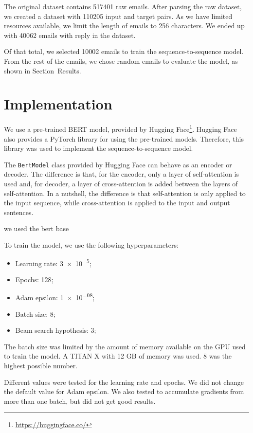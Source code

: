 \documentclass[letterpaper]{article}
\begin{document}
The original dataset contains \num{517401} raw emails. After parsing the raw dataset, we created a dataset with \num{110205} input and target pairs. As we have limited resources available, we limit the length of emails to \num{256} characters. We ended up with \num{40062} emails with reply in the dataset.

Of that total, we selected \num{10002} emails to train the sequence-to-sequence model. From the rest of the emails, we chose random emails to evaluate the model, as shown in Section~Results.


\section{Implementation}

We use a pre-trained BERT model, provided by Hugging Face\footnote{\href{https://huggingface.co/}{https://huggingface.co/}}. Hugging Face also provides a PyTorch library for using the pre-trained models. Therefore, this library was used to implement the sequence-to-sequence model.

The \texttt{BertModel} class provided by Hugging Face can behave as an encoder or decoder. The difference is that, for the encoder, only a layer of self-attention is used and, for decoder, a layer of cross-attention is added between the layers of self-attention. In a nutshell, the difference is that self-attention is only applied to the input sequence, while cross-attention is applied to the input and output sentences.

we used the bert base

To train the model, we use the following hyperparameters:

\begin{itemize}
    \item Learning rate: \num{3e-5};
    \item Epochs: \num{128};
    \item Adam epsilon: \num{1e-08};
    \item Batch size: \num{8};
    \item Beam search hypothesis: \num{3};
\end{itemize}

The batch size was limited by the amount of memory available on the GPU used to train the model. A TITAN X with 12 GB of memory was used. \num{8} was the highest possible number.

Different values were tested for the learning rate and epochs. We did not change the default value for Adam epsilon. We also tested to accumulate gradients from more than one batch, but did not get good results.
\end{document}
